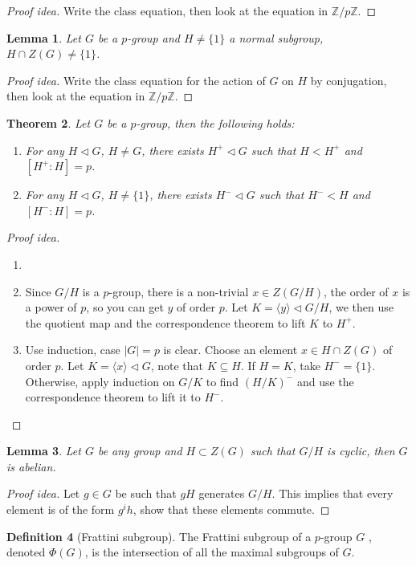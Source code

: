 \documentclass[paper=a4, fontsize=12pt]{scrartcl} %
\newtheorem{thm}{Theorem}[section]
\newtheorem{lem}[thm]{Lemma}
\theoremstyle{definition}
\newtheorem{defn}[thm]{Definition}
\theoremstyle{remark}
\newcommand{\Z}{\mathbb{Z}}
\numberwithin{equation}{section} %
\numberwithin{figure}{section} %
\numberwithin{table}{section} %
\begin{document}
\begin{proof}[Proof idea]
	Write the class equation, then look at the equation in $\Z/p\Z$.
\end{proof}
\begin{lem}
	Let $G$ be a $p$-group and $H \neq \{1\}$ a normal subgroup, $H \cap Z(G) \neq \{1\}$.
\end{lem}
\begin{proof}[Proof idea]
	Write the class equation for the action of $G$ on $H$ by conjugation, then look at the equation in $\Z/p\Z$.
\end{proof}
\begin{thm}
	Let $G$ be a $p$-group, then the following holds:
	\begin{enumerate}
		\item For any $H \lhd G$, $H \neq G$, there exists $H^{+} \lhd G$ such that $H < H^{+}$ and $[H^+:H] = p$.
		\item For any $H \lhd G$, $H \neq \{1\}$, there exists $H^{-} \lhd G$ such that $H^- < H$ and $[H^-:H] = p$.
	\end{enumerate}
\end{thm}
\begin{proof}[Proof idea]
	\begin{enumerate}
		\item[]
		\item Since $G/H$ is a $p$-group, there is a non-trivial $x \in Z(G/H)$, the order of $x$ is a power of $p$, so you can get $y$ of order $p$. Let $K = \langle y \rangle \lhd G/H$, we then use the quotient map and the correspondence theorem to lift $K$ to $H^+$. 
		\item Use induction, case $|G| = p$ is clear. Choose an element $x \in H \cap Z(G)$ of order $p$. Let $K = \langle x \rangle \lhd G$, note that $K \subseteq H$. If $H = K$, take $H^- = \{1\}$. Otherwise, apply induction on $G/K$ to find $(H/K)^{-}$ and use the correspondence theorem to lift it to $H^-$.
	\end{enumerate}
	
\end{proof}
\begin{lem}
	Let $G$ be any group and $H \subset Z(G)$ such that $G/H$ is cyclic, then $G$ is abelian.
\end{lem}
\begin{proof}[Proof idea]
	Let $g \in G$ be such that $gH$ generates $G/H$. This implies that every element is of the form $g^ih$, show that these elements commute.
\end{proof}
\begin{defn}[Frattini subgroup]
	The Frattini subgroup of a $p$-group $G$ , denoted $\Phi(G)$, is the intersection of all the maximal subgroups of $G$.
\end{defn}
\end{document}
